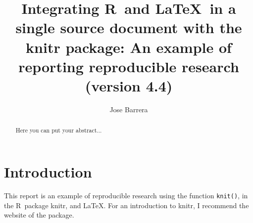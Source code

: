 \documentclass[10pt,a4paper,twoside]{article}\usepackage[]{graphicx}\usepackage[]{xcolor}
\newcommand{\Rpackage}[1]{\textsf{#1}}
\newcommand{\R}{\textsf{R}}
\newcommand{\Rfun}[1]{\texttt{#1\hspace{-0.15em}()}}
\begin{document}


\title{Integrating \R\ and \LaTeX\ in a single source document with the \Rpackage{knitr} package: An example of reporting reproducible research\vspace{1mm} \normalsize{\color{blue}(version 4.4)}}
\author[1,2]{Jose Barrera}

\maketitle
\thispagestyle{empty} %


\clearpage
\thispagestyle{empty}
\null
\clearpage


\begin{abstract}
Here you can put your abstract...
\end{abstract}


\clearpage
\thispagestyle{empty}
\null
\clearpage



\tableofcontents


\clearpage
\thispagestyle{empty}
\null
\clearpage




\section{Introduction}
\label{sec:intro}
This report is an example of reproducible research using the function \Rfun{knit}, in the \R\ package \Rpackage{knitr}, and \LaTeX. For an introduction to \Rpackage{knitr}, I recommend the website of the package\cite{knitr}.

\end{document}
